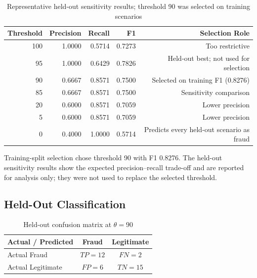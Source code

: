 \begin{table}[htbp]
\centering
\caption{Representative held-out sensitivity results; threshold 90 was selected on training scenarios}
\label{tab:threshold_selection_results}
\begin{tabular}{|r|r|r|r|r|}
\hline
\textbf{Threshold} & \textbf{Precision} & \textbf{Recall} &
\textbf{F1} & \textbf{Selection Role} \\
\hline
100 & 1.0000 & 0.5714 & 0.7273 & Too restrictive \\
\hline
95 & 1.0000 & 0.6429 & 0.7826 & Held-out best; not used for selection \\
\hline
90 & 0.6667 & 0.8571 & 0.7500 & Selected on training F1 (0.8276) \\
\hline
85 & 0.6667 & 0.8571 & 0.7500 & Sensitivity comparison \\
\hline
20 & 0.6000 & 0.8571 & 0.7059 & Lower precision \\
\hline
5 & 0.6000 & 0.8571 & 0.7059 & Lower precision \\
\hline
0 & 0.4000 & 1.0000 & 0.5714 & Predicts every held-out scenario as fraud \\
\hline
\end{tabular}
\end{table}

Training-split selection chose threshold 90 with F1 0.8276. The held-out
sensitivity results show the expected precision--recall trade-off and are
reported for analysis only; they were not used to replace the selected
threshold.

\subsection{Held-Out Classification}

\begin{table}[htbp]
\centering
\caption{Held-out confusion matrix at \(\theta=90\)}
\label{tab:heldout_confusion}
\begin{tabular}{|p{4.3cm}|c|c|}
\hline
\textbf{Actual / Predicted} & \textbf{Fraud} & \textbf{Legitimate} \\
\hline
Actual Fraud & \(TP=12\) & \(FN=2\) \\
\hline
Actual Legitimate & \(FP=6\) & \(TN=15\) \\
\hline
\end{tabular}
\end{table}

